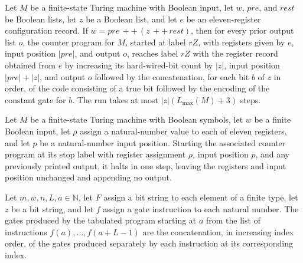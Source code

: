 \begin{theorem}
\label{Complexity.UTab.goes_rZ}
\leanok
{}
Let $M$ be a finite-state Turing machine with Boolean input, let $w$, $pre$, and $rest$
be Boolean lists, let $z$ be a Boolean list, and let $e$ be an eleven-register
configuration record. If $w = pre \, ++ \, (z \, ++ \, rest)$, then for every prior
output list $o$, the counter program for $M$, started at label $rZ$, with registers
given by $e$, input position $|pre|$, and output $o$, reaches label $rZ$ with the
register record obtained from $e$ by increasing its hard-wired-bit count by $|z|$, input
position $|pre|+|z|$, and output $o$ followed by the concatenation, for each bit $b$ of
$z$ in order, of the code consisting of a true bit followed by the encoding of the
constant gate for $b$. The run takes at most $|z|(L_{\max}(M)+3)$ steps.
\end{theorem}

\begin{theorem}
\label{Complexity.UTab.goes_stop}
\leanok
{}
Let $M$ be a finite-state Turing machine with Boolean symbols, let $w$ be a finite
Boolean input, let $\rho$ assign a natural-number value to each of eleven registers, and
let $p$ be a natural-number input position. Starting the associated counter program at
its stop label with register assignment $\rho$, input position $p$, and any previously
printed output, it halts in one step, leaving the registers and input position unchanged
and appending no output.
\end{theorem}

\begin{theorem}
\label{Complexity.UTab.tabProgGates_range'}
\leanok
{}
Let $m,w,n,L,a\in\mathbb{N}$, let $F$ assign a bit string to each element of a finite
type, let $z$ be a bit string, and let $f$ assign a gate instruction to each natural
number. The gates produced by the tabulated program starting at $a$ from the list of
instructions $f(a),\ldots,f(a+L-1)$ are the concatenation, in increasing index order, of
the gates produced separately by each instruction at its corresponding index.
\end{theorem}

